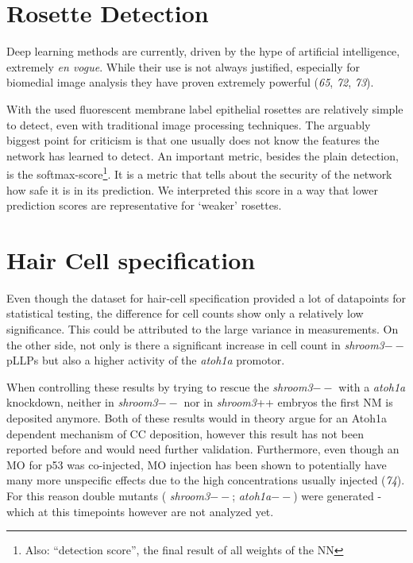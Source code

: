 \documentclass[11pt,singlespacinge,twoside]{reedthesis} %
\begin{document}
\hypertarget{rosette-detection}{%
\section{Rosette Detection}\label{rosette-detection}}

Deep learning methods are currently, driven by the hype of artificial intelligence, extremely \emph{en vogue}. While their use is not always justified, especially for biomedial image analysis they have proven extremely powerful (\emph{65}, \emph{72}, \emph{73}).

With the used fluorescent membrane label epithelial rosettes are relatively simple to detect, even with traditional image processing techniques. The arguably biggest point for criticism is that one usually does not know the features the network has learned to detect. An important metric, besides the plain detection, is the softmax-score\footnote{Also: ``detection score'', the final result of all weights of the NN}. It is a metric that tells about the security of the network how safe it is in its prediction. We interpreted this score in a way that lower prediction scores are representative for `weaker' rosettes.

\hypertarget{hair-cell-specification-1}{%
\section{Hair Cell specification}\label{hair-cell-specification-1}}

Even though the dataset for hair-cell specification provided a lot of datapoints for statistical testing, the difference for cell counts show only a relatively low significance. This could be attributed to the large variance in measurements. On the other side, not only is there a significant increase in cell count in \emph{shroom3}\(--\) pLLPs but also a higher activity of the \emph{atoh1a} promotor.

When controlling these results by trying to rescue the \emph{shroom3}\(--\) with a \emph{atoh1a} knockdown, neither in \emph{shroom3}\(--\) nor in \emph{shroom3}++ embryos the first NM is deposited anymore. Both of these results would in theory argue for an Atoh1a dependent mechanism of CC deposition, however this result has not been reported before and would need further validation. Furthermore, even though an MO for p53 was co-injected, MO injection has been shown to potentially have many more unspecific effects due to the high concentrations usually injected (\emph{74}). For this reason double mutants ( \emph{shroom3}\(--\); \emph{atoh1a}\(--\)) were generated - which at this timepoints however are not analyzed yet.
\end{document}
